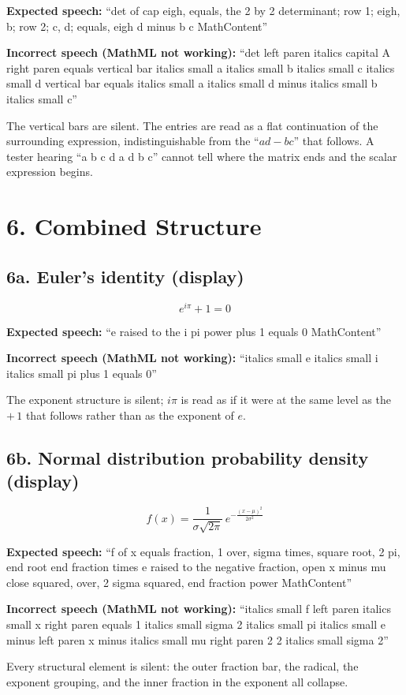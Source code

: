 \documentclass{article}
\begin{document}
\textbf{Expected speech:} ``det of cap eigh, equals, the 2 by 2 determinant; 
row 1; eigh, b; row 2; c, d; equals, eigh d minus b c MathContent''

\textbf{Incorrect speech (MathML not working):} ``det left paren italics capital A right paren equals vertical bar italics small a italics small b italics small c italics small d vertical bar equals italics small a italics small d minus italics small b italics small c''

The vertical bars are silent. The entries are read as a flat continuation
of the surrounding expression, indistinguishable from the ``$ad - bc$''
that follows. A tester hearing ``a b c d a d b c'' cannot tell where the
matrix ends and the scalar expression begins.

\section*{6. Combined Structure}

\subsection*{6a. Euler's identity (display)}

\[
  e^{i\pi} + 1 = 0
\]

\textbf{Expected speech:} ``e raised to the i pi power plus 1 
equals 0 MathContent''

\textbf{Incorrect speech (MathML not working):} ``italics small e 
italics small i italics small pi plus 1 equals 0''

The exponent structure is silent; $i\pi$ is read as if it were at the
same level as the $+\,1$ that follows rather than as the exponent of $e$.

\subsection*{6b. Normal distribution probability density (display)}

\[
  f(x) = \frac{1}{\sigma\sqrt{2\pi}}\, e^{-\frac{(x-\mu)^2}{2\sigma^2}}
\]

\textbf{Expected speech:} ``f of x equals fraction, 1 over, sigma times, 
square root, 2 pi, end root end fraction times e raised to the negative fraction, 
open x minus mu close squared, over, 2 sigma squared, end fraction power  
MathContent''

\textbf{Incorrect speech (MathML not working):} ``italics small f left paren 
italics small x right paren equals 1 italics small sigma 2 italics small pi 
italics small e minus left paren x minus italics small mu right paren 2 2 
italics small sigma 2''

Every structural element is silent: the outer fraction bar, the radical,
the exponent grouping, and the inner fraction in the exponent all collapse.
\end{document}
